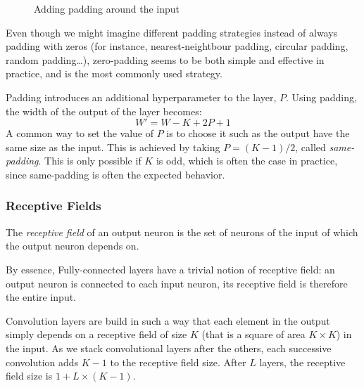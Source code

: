 \begin{figure}[H]
    \caption{Adding padding around the input}
\end{figure}

\begin{remark}
    Even though we might imagine different padding strategies instead of always padding with zeros (for instance, nearest-neightbour padding, circular padding, random padding\dots), zero-padding seems to be both simple and effective in practice, and is the most commonly used strategy.
\end{remark}

Padding introduces an additional hyperparameter to the layer, $P$. 
Using padding, the width of the output of the layer becomes:
\begin{equation}
    \label{eq:output-padding}
    W'=W-K+2P+1
\end{equation}
A common way to set the value of $P$ is to choose it such as the output have the same size as the input. This is achieved by taking $P=(K-1)/2$, called \emph{same-padding}. This is only possible if $K$ is odd, which is often the case in practice, since same-padding is often the expected behavior.

\subsubsection{Receptive Fields}
\begin{definition}
    The \emph{receptive field} of an output neuron is the set of neurons of the input of which the output neuron depends on.
\end{definition}

By essence, Fully-connected layers have a trivial notion of receptive field: an output neuron is connected to each input neuron, its receptive field is therefore the entire input.

Convolution layers are build in such a way that each element in the output simply depends on a receptive field of size $K$ (that is a square of area $K\times K$) in the input. As we stack convolutional layers after the others, each successive convolution adds $K-1$ to the receptive field size. After $L$ layers, the receptive field size is $1+L\times(K-1)$. 

